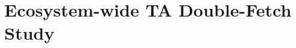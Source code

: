 \documentclass[conference]{IEEEtran}
\newcommand{\sysname}{ScHMuzz\xspace}
\newcommand{\taemu}{TÄMU\xspace}
\begin{document}


% 

\section{Ecosystem-wide TA Double-Fetch Study}\label{sec:ecostudy}



\end{document}
